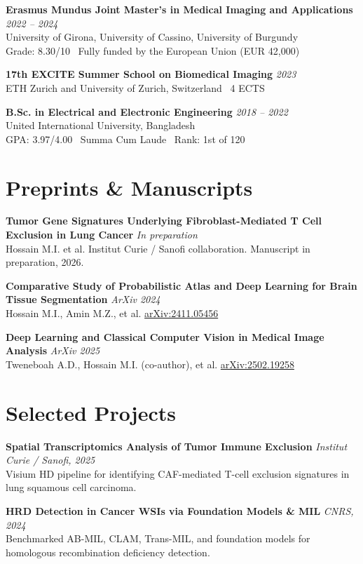 \documentclass[10pt,a4paper]{article}
\begin{document}
\textbf{Erasmus Mundus Joint Master's in Medical Imaging and Applications} \hfill \textit{2022 -- 2024}\\
University of Girona, University of Cassino, University of Burgundy\\
Grade: 8.30/10 \textbar\ Fully funded by the European Union (EUR 42,000)

\textbf{17th EXCITE Summer School on Biomedical Imaging} \hfill \textit{2023}\\
ETH Zurich and University of Zurich, Switzerland \textbar\ 4 ECTS

\textbf{B.Sc. in Electrical and Electronic Engineering} \hfill \textit{2018 -- 2022}\\
United International University, Bangladesh\\
GPA: 3.97/4.00 \textbar\ Summa Cum Laude \textbar\ Rank: 1st of 120

\section*{Preprints \& Manuscripts}
\textbf{Tumor Gene Signatures Underlying Fibroblast-Mediated T Cell Exclusion in Lung Cancer} \hfill \textit{In preparation}\\
Hossain M.I. et al. Institut Curie / Sanofi collaboration. Manuscript in preparation, 2026.

\textbf{Comparative Study of Probabilistic Atlas and Deep Learning for Brain Tissue Segmentation} \hfill \textit{ArXiv 2024}\\
Hossain M.I., Amin M.Z., et al. \href{https://arxiv.org/abs/2411.05456}{arXiv:2411.05456}

\textbf{Deep Learning and Classical Computer Vision in Medical Image Analysis} \hfill \textit{ArXiv 2025}\\
Tweneboah A.D., Hossain M.I. (co-author), et al. \href{https://arxiv.org/abs/2502.19258}{arXiv:2502.19258}

\section*{Selected Projects}
\textbf{Spatial Transcriptomics Analysis of Tumor Immune Exclusion} \hfill \textit{Institut Curie / Sanofi, 2025}\\
Visium HD pipeline for identifying CAF-mediated T-cell exclusion signatures in lung squamous cell carcinoma.

\textbf{HRD Detection in Cancer WSIs via Foundation Models \& MIL} \hfill \textit{CNRS, 2024}\\
Benchmarked AB-MIL, CLAM, Trans-MIL, and foundation models for homologous recombination deficiency detection.
\end{document}
